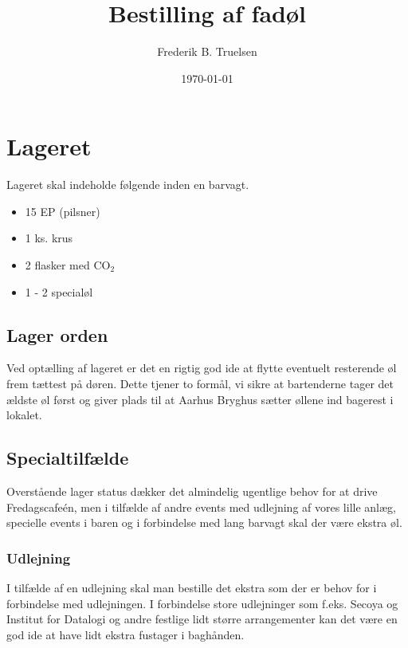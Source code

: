 

\title{Bestilling af fadøl}
\date{\today}
\author{Frederik B. Truelsen}



\maketitle

\section{Lageret}

Lageret skal indeholde følgende inden en barvagt.

\begin{itemize}
\item 15 EP (pilsner)
\item 1 ks. krus
\item 2 flasker med CO$_{2}$
\item 1 - 2 specialøl
\end{itemize} 

\subsection{Lager orden}

Ved optælling af lageret er det en rigtig god ide at flytte eventuelt resterende øl frem tættest på døren.
Dette tjener to formål, vi sikre at bartenderne tager det ældste øl først og giver plads til at Aarhus Bryghus
sætter øllene ind bagerest i lokalet.

\subsection{Specialtilfælde}

Overstående lager status dækker det almindelig ugentlige behov for at drive Fredagscafeén,
men i tilfælde af andre events med udlejning af vores lille anlæg, specielle events i baren og
i forbindelse med lang barvagt skal der være ekstra øl.

\subsubsection*{Udlejning}

I tilfælde af en udlejning skal man bestille det ekstra som der er behov for i forbindelse med
udlejningen. I forbindelse store udlejninger som f.eks. Secoya og Institut for Datalogi og andre
festlige lidt større arrangementer  kan det være en god ide at have lidt ekstra fustager i baghånden.

